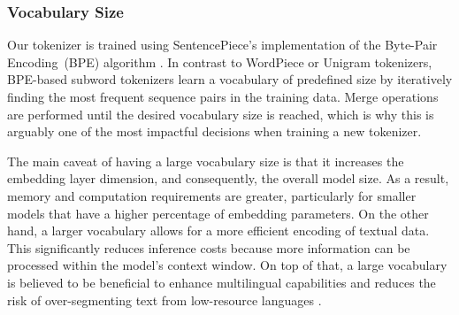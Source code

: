 \subsubsection{Vocabulary Size}
Our tokenizer is trained using SentencePiece's implementation \cite{sentencepiece} of the Byte-Pair \mbox{Encoding (BPE)} algorithm \cite{bpe}. In contrast to WordPiece \cite{wordpiece} or Unigram \cite{unigram} \mbox{tokenizers}, BPE-based subword tokenizers learn a vocabulary of predefined size by iteratively finding the most frequent sequence pairs in the training data. Merge operations are performed until the desired vocabulary size is reached, which is why this is arguably one of the most impactful decisions when training a new tokenizer.

The main caveat of having a large vocabulary size is that it increases the embedding layer dimension, and consequently, the overall model size. As a result, memory and computation requirements are greater, particularly for smaller models that have a higher percentage of embedding parameters. On the other hand, a larger vocabulary allows for a more efficient encoding of textual data. This significantly reduces inference costs because more information can be processed within the model’s context window. On top of that, a large vocabulary is believed to be beneficial to enhance multilingual capabilities and reduces the risk of over-segmenting text from low-resource languages \cite{bloom}.




